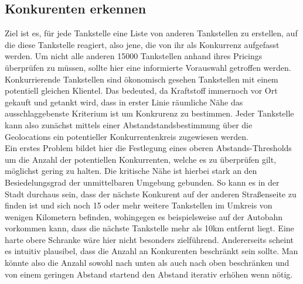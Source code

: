 \documentclass[12pt,a4paper,bibliography=totocnumbered,listof=totocnumbered]{scrartcl}
\begin{document}
\subsection{Konkurenten erkennen}

Ziel ist es, für jede Tankstelle eine Liste von anderen Tankstellen zu erstellen, auf die diese Tankstelle reagiert, also jene, die von ihr als Konkurrenz aufgefasst werden. Um nicht alle anderen 15000 Tankstellen anhand ihres Pricings überprüfen zu müssen, sollte hier eine informierte Vorauswahl getroffen werden. Konkurrierende Tankstellen sind ökonomisch gesehen Tankstellen mit einem potentiell gleichen Klientel. Das bedeuted, da Kraftstoff immernoch vor Ort gekauft und getankt wird, dass in erster Linie räumliche Nähe das ausschlaggebenste Kriterium ist um Konkrurenz zu bestimmen. Jeder Tankstelle kann also zunächst mittels einer Abstandstandsbestimmung über die Geolocations ein potentieller Konkurrentenkreis zugewiesen werden.\\

Ein erstes Problem bildet hier die Festlegung eines oberen Abstands-Thresholds um die Anzahl der potentiellen Konkurrenten, welche es zu überprüfen gilt, möglichst gering zu halten. Die kritische Nähe ist hierbei stark an den Besiedelungsgrad der unmittelbaren Umgebung gebunden. So kann es in der Stadt durchaus sein, dass der nächste Konkurent auf der anderen Straßenseite zu finden ist und sich noch 15 oder mehr weitere Tankstellen im Umkreis von wenigen Kilometern befinden, wohingegen es beispielsweise auf der Autobahn vorkommen kann, dass die nächste Tankstelle mehr als 10km entfernt liegt. Eine harte obere Schranke wäre hier nicht besonders zielführend. Andererseits scheint es intuitiv plausibel, dass die Anzahl an Konkurenten beschränkt sein sollte. Man könnte also die Anzahl sowohl nach unten als auch nach oben beschränken und von einem geringen Abstand startend den Abstand iterativ erhöhen wenn nötig.\\
\end{document}
